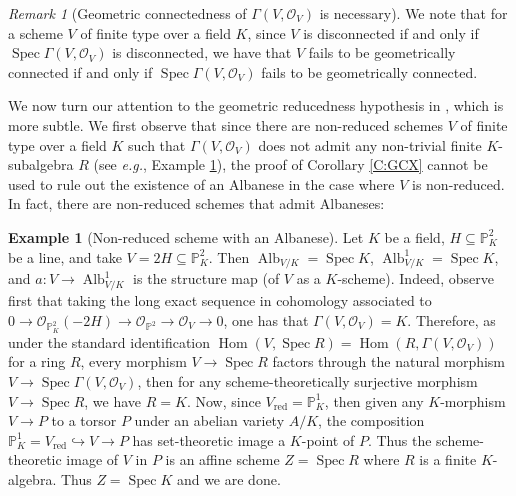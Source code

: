 \documentclass[11pt, reqno]{amsart}
\numberwithin{equation}{section}
\theoremstyle{definition}
\newtheorem{exa}[teo]{Example}
\theoremstyle{remark}
\newtheorem{rem}[teo]{Remark}
\DeclareMathOperator{\spec}{Spec}
\begin{document}
  
\begin{rem}[Geometric connectedness of $\Gamma(V,\mathcal O_V)$ is necessary]\label{R:geomconn} We note that for  a scheme $V$ of finite type over a field $K$, since $V$ is disconnected if and only if $\spec \Gamma(V,\mathcal O_V)$ is disconnected, we have that $V$ 
 fails to be geometrically connected if and only if  $\operatorname{Spec} \Gamma(V,\mathcal O_V)$ fails to be geometrically connected.
        \end{rem}


We now turn our attention to the geometric reducedness hypothesis in , which is more subtle.   
We first observe that since there are non-reduced schemes $V$ of finite type over a field $K$  such that $\Gamma(V,\mathcal O_V)$ does not admit 
  any non-trivial finite $K$-subalgebra $R$ (see \emph{e.g.}, Example \ref{E:NonRedAlb}), the proof of Corollary \ref{C:GCX} cannot be used to rule out the existence of an Albanese in the case where $V$ is non-reduced.    In fact, there are non-reduced schemes that admit Albaneses: 

\begin{exa}[Non-reduced scheme with an Albanese]\label{E:NonRedAlb}
Let $K$ be a field,  $H\subseteq \mathbb P^2_K$ be a line, and take $V=2H\subseteq \mathbb P^2_K$.  
Then $\operatorname{Alb}_{V/K}=\operatorname{Spec}K$, $\operatorname{Alb}^1_{V/K}=\operatorname{Spec}K$, and $a:V\to \operatorname{Alb}^1_{V/K}$ is the structure map (of $V$ as a $K$-scheme).
Indeed, observe first that 
taking the long exact sequence in cohomology associated to $0\to \mathcal O_{\mathbb P^2_K}(-2H)\to \mathcal O_{\mathbb P^2}\to \mathcal O_V\to 0$, one has that $\Gamma(V,\mathcal O_V)=K$.    Therefore, as under the standard identification $\operatorname{Hom}(V,\operatorname{Spec}R)=\operatorname{Hom}(R,\Gamma (V,\mathcal O_V))$ for a ring $R$, every morphism $V\to \operatorname{Spec}R$ factors through the natural morphism $V\to \operatorname{Spec}\Gamma(V,\mathcal O_V)$, then for any scheme-theoretically surjective morphism $V\to \operatorname{Spec}R$, we have $R=K$.   
 Now, since $V_{\operatorname{red}}=\mathbb P^1_K$, then given any $K$-morphism $V\to P$ to a torsor $P$ under an abelian variety $A/K$, the composition $\mathbb P^1_K=V_{\operatorname{red}}\hookrightarrow V\to P$ has set-theoretic image a $K$-point of $P$.  Thus the scheme-theoretic image of $V$ in $P$ is an affine scheme $Z=\operatorname{Spec}R$ where $R$ is a finite $K$-algebra.  Thus $Z=\operatorname{Spec}K$ and we are done.
\end{exa}
\end{document}
